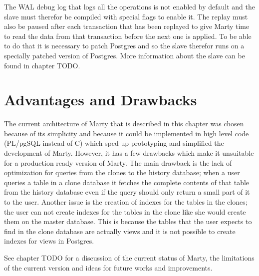 The WAL debug log that logs all the operations is not enabled by default and the slave must therefor be compiled with special flags to enable it.
The replay must also be paused after each transaction that has been replayed to give Marty time to read the data from that transaction before the next one is applied.
To be able to do that it is necessary to patch Postgres and so the slave therefor runs on a specially patched version of Postgres.
More information about the slave can be found in chapter TODO.

\section{Advantages and Drawbacks}
The current architecture of Marty that is described in this chapter was chosen because of its simplicity and because it could be implemented in high level code (PL/pgSQL instead of C) which sped up prototyping and simplified the development of Marty.
However, it has a few drawbacks which make it unsuitable for a production ready version of Marty.
The main drawback is the lack of optimization for queries from the clones to the history database; when a user queries a table in a clone database it fetches the complete contents of that table from the history database even if the query should only return a small part of it to the user.
Another issue is the creation of indexes for the tables in the clones; the user can not create indexes for the tables in the clone like she would create them on the master database.
This is because the tables that the user expects to find in the clone database are actually views and it is not possible to create indexes for views in Postgres.

See chapter TODO for a discussion of the current status of Marty, the limitations of the current version and ideas for future works and improvements.
